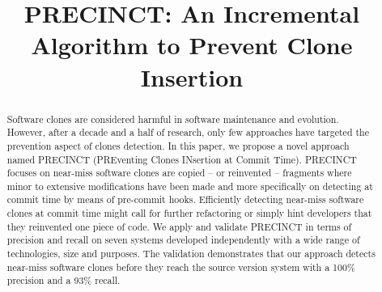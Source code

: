 \documentclass[conference]{IEEEtran}
\begin{document}
\title{PRECINCT: An Incremental Algorithm to Prevent Clone Insertion}


\author{
\and
{}
}

\maketitle

\begin{abstract}
  Software clones are considered harmful in software maintenance and evolution. However, after a decade and a half of research, only few approaches have targeted the prevention aspect of clones detection.
  In this paper, we propose a novel approach named PRECINCT (PREventing Clones INsertion at Commit Time). PRECINCT focuses on near-miss software clones are copied -- or reinvented -- fragments where minor to extensive modifications have been made and more specifically on detecting at commit time by means of pre-commit hooks.
  Efficiently detecting near-miss software clones at commit time might call for further refactoring or simply hint developers that they reinvented one piece of code.
  We apply and validate PRECINCT in terms of precision and recall on seven systems developed independently with a wide range of technologies, size and purposes.
  The validation demonstrates that our approach detects near-miss software clones before they reach the source version system with a 100\% precision and a 93\% recall.



\end{abstract}


\IEEEpeerreviewmaketitle






\end{document}
